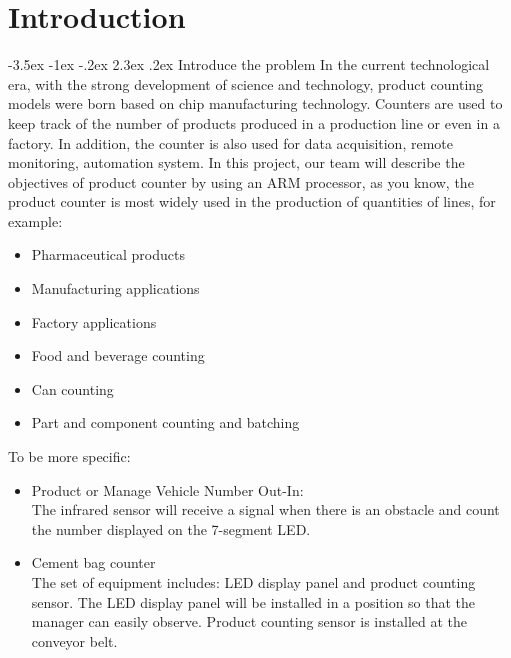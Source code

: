 \documentclass[13pt,a4paper,twoside]{report}
\makeatletter
\renewcommand\section{\@startsection {section}{1}{-1em}%
  {-3.5ex \@plus -1ex \@minus -.2ex}%
  {2.3ex \@plus.2ex}%
  {\normalfont\Large\bfseries}}
\makeatother
\begin{document}
\chapter{Introduction}
\section{Introduce the problem}
In the current technological era, with the strong development of science and technology, product counting models were born based on chip manufacturing technology. Counters are used to keep track of the number of products produced in a production line or even in a factory. In addition, the counter is also used for data acquisition, remote monitoring, automation system. In this project, our team will describe the objectives of product counter by using an ARM processor, as you know, the product counter is most widely used in the production of quantities of lines, for example:
\begin{itemize}
\item Pharmaceutical products
\item Manufacturing applications
\item Factory applications
\item Food and beverage counting
\item Can counting
\item Part and component counting and batching
\end{itemize}

To be more specific:
\begin{itemize}
\item Product or Manage Vehicle Number Out-In:\\
    The infrared sensor will receive a signal when there is an obstacle and count the number displayed on the 7-segment LED.
\item Cement bag counter\\
    The set of equipment includes: LED display panel and product counting sensor. The LED display panel will be installed in a position so that the manager can easily observe. Product counting sensor is installed at the conveyor belt.
\end{itemize}
\end{document}
